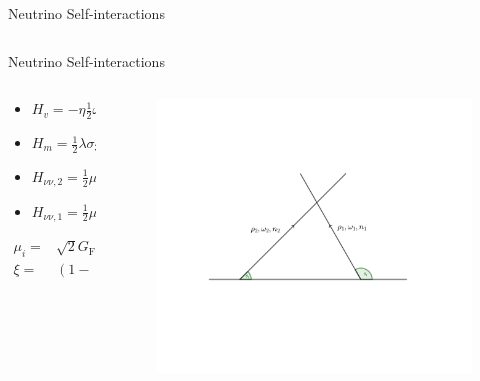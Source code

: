 \documentclass[9pt]{beamer}
\begin{document}
\begin{darkframes}
\begin{frame}{Neutrino Self-interactions}
\begin{columns}[T]
\begin{column}{0.65\textwidth}
   \end{column}


\end{columns}





\end{frame}

\begin{frame}{Neutrino Self-interactions}

\begin{columns}[T]

\begin{column}{0.5\textwidth}

\begin{itemize}
   \item $H_v = - \eta \frac{1}{2}\omega \sigma_3 $
   \item $H_m = \frac{1}{2}\lambda \sigma_3$
   \item $H_{\nu\nu,2} = \frac{1}{2}\mu_1 \rho_1 \xi $
   \item $H_{\nu\nu,1} = \frac{1}{2}\mu_2 \rho_2 \xi$
\end{itemize}


\begin{align*}
   \mu_i =& \sqrt{2} G_{\mathrm F} (1-\cos(\theta_1 - \theta_2)) n_i \\
   \xi =& (1-\cos(\theta_1-\theta_2))
\end{align*}


\end{column}

\begin{column}{0.5\textwidth}
\begin{figure}
   \includegraphics[width=\textwidth]{assets/two-beams-model}
\end{figure}
\end{column}



\end{columns}
\end{frame}
\end{darkframes}
\end{document}
